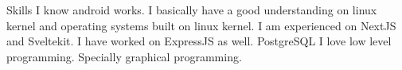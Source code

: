 
\begin{rubric}{Skills}
\entry*[Android]
	I know android works. I basically have a good understanding on linux kernel and operating systems built on linux kernel.
\entry*[Web]
	I am experienced on NextJS and Sveltekit. I have worked on ExpressJS as well.
\entry*[Databases]
	PostgreSQL
\entry*[C++]
	I love low level programming. Specially graphical programming.
\end{rubric}
